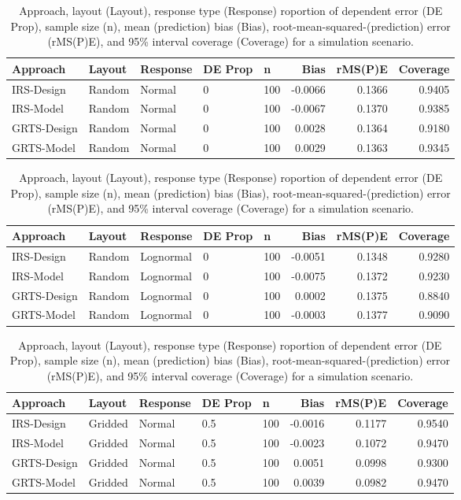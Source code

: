 \documentclass[]{elsarticle} %
\begin{document}
\begin{table}[ht]
\centering
\begin{tabular}{lllllrrr}
  \hline
Approach & Layout & Response & DE Prop & n & Bias & rMS(P)E & Coverage \\ 
  \hline
IRS-Design & Random & Normal & 0 & 100 & -0.0066 & 0.1366 & 0.9405 \\ 
  IRS-Model & Random & Normal & 0 & 100 & -0.0067 & 0.1370 & 0.9385 \\ 
  GRTS-Design & Random & Normal & 0 & 100 & 0.0028 & 0.1364 & 0.9180 \\ 
  GRTS-Model & Random & Normal & 0 & 100 & 0.0029 & 0.1363 & 0.9345 \\ 
   \hline
\end{tabular}
\caption{Approach, layout (Layout), response type (Response) roportion of dependent error (DE Prop), sample size (n), mean (prediction) bias (Bias), root-mean-squared-(prediction) error (rMS(P)E), and 95\% interval coverage (Coverage) for a simulation scenario.} 
\end{table}
\begin{table}[ht]
\centering
\begin{tabular}{lllllrrr}
  \hline
Approach & Layout & Response & DE Prop & n & Bias & rMS(P)E & Coverage \\ 
  \hline
IRS-Design & Random & Lognormal & 0 & 100 & -0.0051 & 0.1348 & 0.9280 \\ 
  IRS-Model & Random & Lognormal & 0 & 100 & -0.0075 & 0.1372 & 0.9230 \\ 
  GRTS-Design & Random & Lognormal & 0 & 100 & 0.0002 & 0.1375 & 0.8840 \\ 
  GRTS-Model & Random & Lognormal & 0 & 100 & -0.0003 & 0.1377 & 0.9090 \\ 
   \hline
\end{tabular}
\caption{Approach, layout (Layout), response type (Response) roportion of dependent error (DE Prop), sample size (n), mean (prediction) bias (Bias), root-mean-squared-(prediction) error (rMS(P)E), and 95\% interval coverage (Coverage) for a simulation scenario.} 
\end{table}
\begin{table}[ht]
\centering
\begin{tabular}{lllllrrr}
  \hline
Approach & Layout & Response & DE Prop & n & Bias & rMS(P)E & Coverage \\ 
  \hline
IRS-Design & Gridded & Normal & 0.5 & 100 & -0.0016 & 0.1177 & 0.9540 \\ 
  IRS-Model & Gridded & Normal & 0.5 & 100 & -0.0023 & 0.1072 & 0.9470 \\ 
  GRTS-Design & Gridded & Normal & 0.5 & 100 & 0.0051 & 0.0998 & 0.9300 \\ 
  GRTS-Model & Gridded & Normal & 0.5 & 100 & 0.0039 & 0.0982 & 0.9470 \\ 
   \hline
\end{tabular}
\caption{Approach, layout (Layout), response type (Response) roportion of dependent error (DE Prop), sample size (n), mean (prediction) bias (Bias), root-mean-squared-(prediction) error (rMS(P)E), and 95\% interval coverage (Coverage) for a simulation scenario.} 
\end{table}
\end{document}

